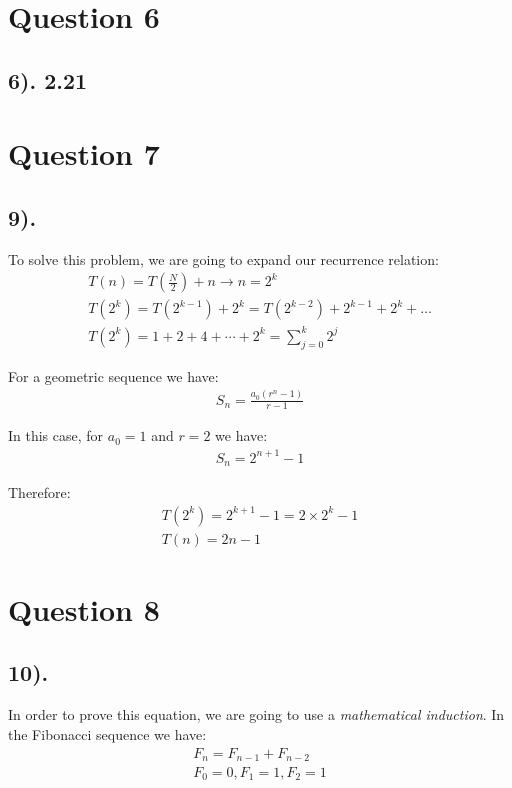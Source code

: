 \documentclass[12pt]{article}
\begin{document}
\section*{Question 6}
\subsection*{6). 2.21}

\section*{Question 7}
\subsection*{9).}
To solve this problem, we are going to expand our recurrence relation:
\begin{gather*}
    T(n) = T(\frac{N}{2}) + n \to n = 2^k \\
    T(2^k) = T(2^{k-1}) + 2^k = T(2^{k-2}) + 2^{k-1} + 2^k + \ldots \\
    T(2^k) = 1 + 2 + 4 + \cdots + 2^k = \sum_{j=0}^k 2^j
\end{gather*}

For a geometric sequence we have:
\begin{gather*}
    S_{n} = \frac{a_{0}(r^n-1)}{r-1}
\end{gather*}

In this case, for $a_{0}=1$ and ${r=2}$ we have:
\begin{gather*}
    S_{n} = 2^{n+1} - 1
\end{gather*}

Therefore:
\begin{gather*}
    T(2^k) = 2^{k+1} - 1 = 2 \times 2^k - 1 \\
    T(n) = 2n - 1
\end{gather*}


\section*{Question 8}
\subsection*{10).}
In order to prove this equation, we are going to use a \textit{mathematical induction}. In the Fibonacci sequence we have:
\begin{gather*}
    F_{n} = F_{n-1} + F_{n-2} \\
    F_{0}=0, F_{1}=1, F_{2}=1
\end{gather*}
\end{document}
